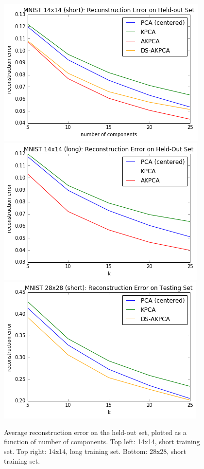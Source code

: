 \documentclass[]{article}
\begin{document}
\begin{figure}[h]
\begin{center}
\includegraphics[scale=0.5]{figures/mnist_14_short_recon_testing}
\includegraphics[scale=0.5]{figures/mnist_14_long_recon_testing}
\includegraphics[scale=0.5]{figures/mnist_28_short_recon_testing}
\caption{Average reconstruction error on the held-out set, plotted as a function of number of components.  Top left: 14x14, short training set.  Top right: 14x14, long training set.  Bottom: 28x28, short training set.}
\end{center}
\end{figure}
\end{document}
